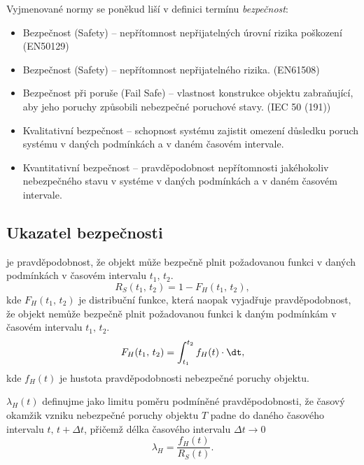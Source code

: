       Vyjmenované normy se poněkud liší v definici termínu \emph{bezpečnost}:  
      \begin{itemize}
        \item Bezpečnost (Safety) – nepřítomnost nepřijatelných úrovní rizika poškození (EN50129)
        \item Bezpečnost (Safety) – nepřítomnost nepřijatelného rizika. (EN61508)
        \item Bezpečnost při poruše (Fail Safe) – vlastnost konstrukce objektu zabraňující,
              aby jeho poruchy způsobili nebezpečné poruchové stavy. (IEC 50 (191))
        \item Kvalitativní bezpečnost – schopnost systému zajistit omezení důsledku poruch
              systému v daných podmínkách a v daném časovém intervale.
        \item Kvantitativní bezpečnost – pravděpodobnost nepřítomnosti jakéhokoliv
              nebezpečného stavu v systéme v daných podmínkách a v daném časovém intervale.
      \end{itemize}

    \subsection{Ukazatel bezpečnosti}
       je pravděpodobnost, že objekt může bezpečně plnit 
      požadovanou funkci v daných podmínkách v časovém intervalu \(t_1,\, t_2\).
      \begin{equation}
        R_S(t_1,\, t_2) = 1- F_H(t_1,\, t_2),
      \end{equation}
      kde \(F_H(t_1,\, t_2)\) je distribuční funkce, která naopak vyjadřuje pravděpodobnost, že objekt nemůže bezpečně plnit požadovanou funkci k daným podmínkám v časovém intervalu \(t_1,\, t_2\).
      \begin{equation}
        F_H(t_1,\, t_2) = \int_{t_1}^{t_2}f_H(t)\cdot\dt,
      \end{equation}
      kde \(f_H(t)\) je hustota pravděpodobnosti nebezpečné poruchy objektu. 

       \(\lambda_H(t)\) definujme jako limitu poměru podmíněné
      pravděpodobnosti, že časový okamžik vzniku nebezpečné poruchy objektu \(T\) padne do daného
      časového intervalu \(t,\, t+\Delta t\), přičemž délka časového intervalu \(\Delta t\rightarrow0\)
      \begin{equation}\label{DZT:eq_def_lambdaH}
        \lambda_H=\frac{f_H(t)}{R_S(t)}.
      \end{equation}


